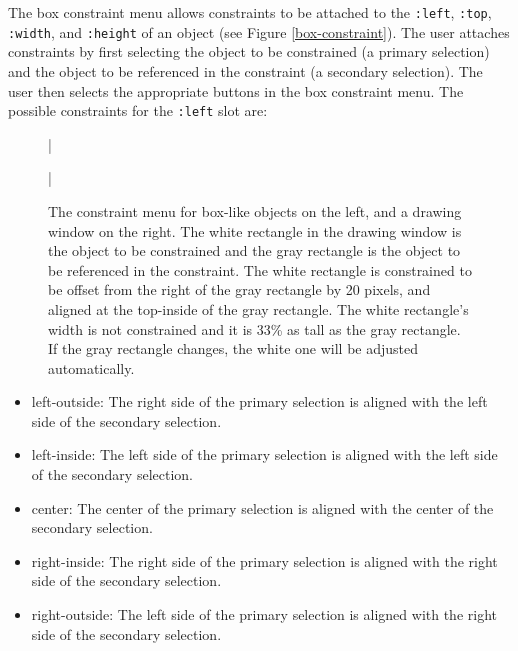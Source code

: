 The box constraint menu allows constraints to be attached to the {\tt :left},
{\tt :top}, {\tt :width}, and {\tt :height} of an object (see Figure
\ref{box-constraint}).
The user attaches constraints by first selecting the object to be constrained
(a primary selection) and the object to be referenced in the constraint
(a secondary selection).
The user then selects the appropriate buttons in the box constraint menu.
The possible constraints for the {\tt :left} slot are:


\begin{figure}
\bar{}
\vspace{0.5 line}
\begin{center}
\end{center}
\caption{
The constraint menu for box-like objects on the left, and a
drawing window on the right. The white
rectangle in the drawing window is the object to be constrained and the gray
rectangle is the object to be referenced in the constraint.
The white rectangle is constrained to
be offset
from the right of the gray rectangle by 20 pixels, and
aligned at the top-inside of the gray rectangle.
The white rectangle's width is not constrained and it is 33\% as tall
as the gray rectangle. If the gray rectangle
changes, the white one will be adjusted automatically.
}
\bar{}
\end{figure}

\begin{itemize}
\item left-outside: The right side of the primary selection is aligned with the
left side of the secondary selection.

\item left-inside: The left side of the primary selection is aligned with the
left side of the secondary selection.

\item center: The center of the primary selection is aligned with the center
of the secondary selection.

\item right-inside: The right side of the primary selection is aligned with the
right side of the secondary selection.

\item right-outside: The left side of the primary selection is aligned with the
right side of the secondary selection.

\end{itemize}

